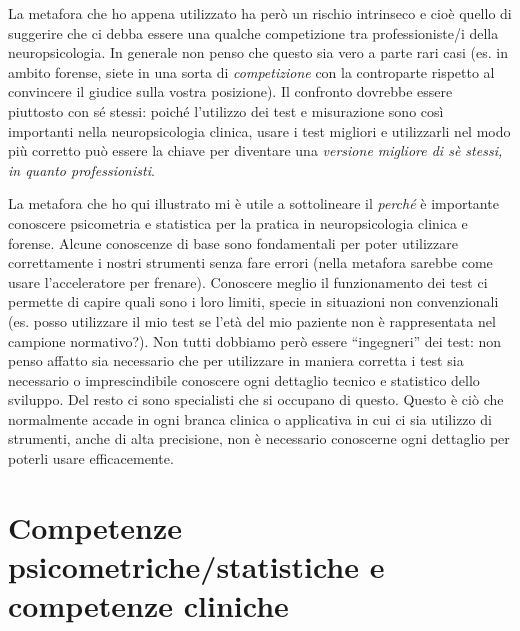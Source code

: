 \documentclass[
  italian,
  letterpaper,
  paper=A4,
  headinclude=on,
  footinclude=on,
  12pt]{scrbook}
\begin{document}
La metafora che ho appena utilizzato ha però un rischio intrinseco e
cioè quello di suggerire che ci debba essere una qualche competizione
tra professioniste/i della neuropsicologia. In generale non penso che
questo sia vero a parte rari casi (es. in ambito forense, siete in una
sorta di \emph{competizione} con la controparte rispetto al convincere
il giudice sulla vostra posizione). Il confronto dovrebbe essere
piuttosto con sé stessi: poiché l'utilizzo dei test e misurazione sono
così importanti nella neuropsicologia clinica, usare i test migliori e
utilizzarli nel modo più corretto può essere la chiave per diventare una
\emph{versione migliore di sè stessi, in quanto professionisti}.

La metafora che ho qui illustrato mi è utile a sottolineare il
\emph{perché} è importante conoscere psicometria e statistica per la
pratica in neuropsicologia clinica e forense. Alcune conoscenze di base
sono fondamentali per poter utilizzare correttamente i nostri strumenti
senza fare errori (nella metafora sarebbe come usare l'acceleratore per
frenare). Conoscere meglio il funzionamento dei test ci permette di
capire quali sono i loro limiti, specie in situazioni non convenzionali
(es. posso utilizzare il mio test se l'età del mio paziente non è
rappresentata nel campione normativo?). Non tutti dobbiamo però essere
``ingegneri'' dei test: non penso affatto sia necessario che per
utilizzare in maniera corretta i test sia necessario o imprescindibile
conoscere ogni dettaglio tecnico e statistico dello sviluppo. Del resto
ci sono specialisti che si occupano di questo. Questo è ciò che
normalmente accade in ogni branca clinica o applicativa in cui ci sia
utilizzo di strumenti, anche di alta precisione, non è necessario
conoscerne ogni dettaglio per poterli usare efficacemente.

\section*{Competenze psicometriche/statistiche e competenze
cliniche}\label{competenze-psicometrichestatistiche-e-competenze-cliniche}

\end{document}
